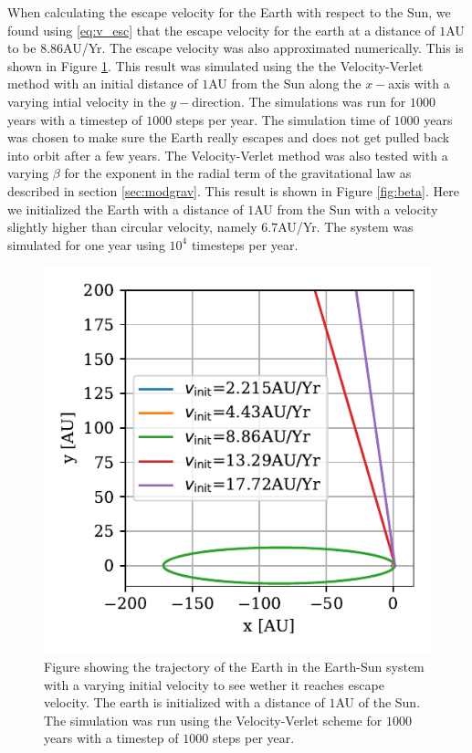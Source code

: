 \documentclass[twocolumn]{aastex62}
\begin{document}
When calculating the escape velocity for the Earth with respect to the Sun, we
found using \ref{eq:v_esc} that the escape velocity for the earth at a distance
of $1$AU to be $8.86$AU/Yr. The escape velocity was also approximated
numerically. This is shown in Figure \ref{fig:escape}. This result was simulated
using the the Velocity-Verlet method with an initial distance of $1$AU from the
Sun along the $x-$axis with a varying intial velocity in the $y-$direction. The
simulations was run for $1000$ years with a timestep of $1000$ steps per year.
The simulation time of $1000$ years was chosen to make sure the Earth really
escapes and does not get pulled back into orbit after a few years. The
Velocity-Verlet method was also tested with a varying $\beta$ for the exponent
in the radial term of the gravitational law as described in section
\ref{sec:modgrav}. This result is shown in Figure \ref{fig:beta}. Here we
initialized the Earth with a distance of $1$AU from the Sun with a velocity
slightly higher than circular velocity, namely $6.7$AU/Yr. The system was
simulated for one year using $10^4$ timesteps per year.


\begin{figure}
\includegraphics[scale=1]{Figures/espace.pdf}
\caption{Figure showing the trajectory of the Earth in the Earth-Sun system with a varying initial velocity to see wether it reaches escape velocity. The earth is initialized with a distance of $1$AU of the Sun. The simulation was run using the Velocity-Verlet scheme for $1000$ years with a timestep of $1000$ steps per year.}
\label{fig:escape}
\end{figure}
\end{document}
